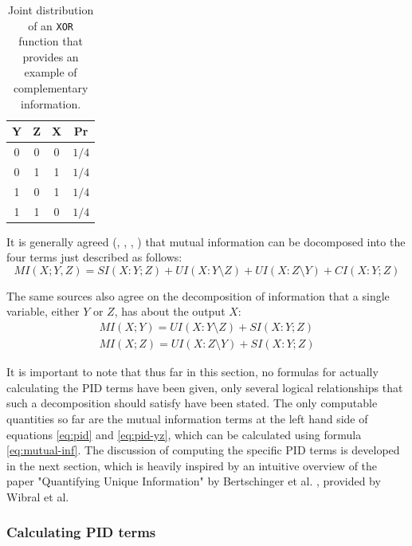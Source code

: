 \documentclass[12pt]{article}
\begin{document}
\begin{table}[h!]
\centering
\caption{Joint distribution of an \texttt{XOR} function that provides an example of complementary information.}
\begin{tabular}{|c c |c|c|}
	\hline
	Y & Z & X & Pr\\ 
	\hline
	0 & 0 & 0 & $1/4$ \\
	0 & 1 & 1 & $1/4$ \\ 
	1 & 0 & 1 & $1/4$ \\ 
	1 & 1 & 0 & $1/4$ \\ 
	\hline
\end{tabular}
\label{table:3}
\end{table}

It is generally agreed (\cite{williams-beer}, \cite{bertschinger}, \cite{pid-redundant}, \cite{pid-synergy}) that mutual information can be docomposed into the four terms just described as follows:
\begin{equation}
MI(X;Y,Z) = SI(X:Y;Z) + UI(X:Y \setminus Z) + UI(X:Z \setminus Y) + CI(X:Y;Z)
\label{eq:pid}
\end{equation}

The same sources also agree on the decomposition of information that a single variable, either $Y$ or $Z$, has about the output $X$: 
\begin{align}
MI(X;Y) = UI(X:Y \setminus Z) + SI(X:Y;Z) \nonumber \\
MI(X;Z) = UI(X:Z \setminus Y) + SI(X:Y;Z)
\label{eq:pid-yz}
\end{align}

It is important to note that thus far in this section, no formulas for actually calculating the PID terms have been given, only several logical relationships that such a decomposition should satisfy have been stated. The only computable quantities so far are the mutual information terms at the left hand side of equations \ref{eq:pid} and \ref{eq:pid-yz}, which can be calculated using formula \ref{eq:mutual-inf}. The discussion of computing the specific PID terms is developed in the next section, which is heavily inspired by an intuitive overview of the paper "Quantifying Unique Information" by Bertschinger et al. \cite{bertschinger}, provided by Wibral et al. \cite{pid-goal-functions} 

\subsubsection{Calculating PID terms}
\end{document}
